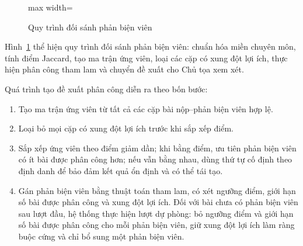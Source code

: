 \begin{figure}[H]
  \centering
  \begin{adjustbox}{max width=\textwidth}
  \end{adjustbox}
  \caption{Quy trình đối sánh phản biện viên}
  \label{fig:ch3-22}
\end{figure}

Hình~\ref{fig:ch3-22} thể hiện quy trình đối sánh phản biện viên: chuẩn hóa miền chuyên môn, tính điểm Jaccard, tạo ma trận ứng viên, loại các cặp có xung đột lợi ích, thực hiện phân công tham lam và chuyển đề xuất cho Chủ tọa xem xét.

Quá trình tạo đề xuất phân công diễn ra theo bốn bước:

\begin{enumerate}
  \item Tạo ma trận ứng viên từ tất cả các cặp bài nộp--phản biện viên hợp lệ.
  \item Loại bỏ mọi cặp có xung đột lợi ích trước khi sắp xếp điểm.
  \item Sắp xếp ứng viên theo điểm giảm dần; khi bằng điểm, ưu tiên phản biện viên có ít bài được phân công hơn; nếu vẫn bằng nhau, dùng thứ tự cố định theo định danh để bảo đảm kết quả ổn định và có thể tái tạo.
  \item Gán phản biện viên bằng thuật toán tham lam, có xét ngưỡng điểm, giới hạn số bài được phân công và xung đột lợi ích. Đối với bài chưa có phản biện viên sau lượt đầu, hệ thống thực hiện lượt dự phòng: bỏ ngưỡng điểm và giới hạn số bài được phân công cho mỗi phản biện viên, giữ xung đột lợi ích làm ràng buộc cứng và chỉ bổ sung một phản biện viên.
\end{enumerate}

